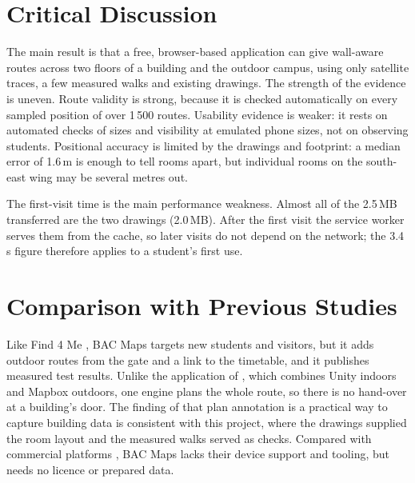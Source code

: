 \documentclass[12pt,a4paper]{report}
\begin{document}
\section{Critical Discussion}
The main result is that a free, browser-based application can give wall-aware routes across two floors of a building and the outdoor campus, using only satellite traces, a few measured walks and existing drawings. The strength of the evidence is uneven. Route validity is strong, because it is checked automatically on every sampled position of over 1\,500 routes. Usability evidence is weaker: it rests on automated checks of sizes and visibility at emulated phone sizes, not on observing students. Positional accuracy is limited by the drawings and footprint: a median error of 1.6\,m is enough to tell rooms apart, but individual rooms on the south-east wing may be several metres out.

The first-visit time is the main performance weakness. Almost all of the 2.5\,MB transferred are the two drawings (2.0\,MB). After the first visit the service worker serves them from the cache, so later visits do not depend on the network; the 3.4\,s figure therefore applies to a student's first use.

\section{Comparison with Previous Studies}
Like Find 4 Me \citep{helmi2022}, BAC Maps targets new students and visitors, but it adds outdoor routes from the gate and a link to the timetable, and it publishes measured test results. Unlike the application of \citet{patel2025}, which combines Unity indoors and Mapbox outdoors, one engine plans the whole route, so there is no hand-over at a building's door. The finding of \citet{ausmeier2012} that plan annotation is a practical way to capture building data is consistent with this project, where the drawings supplied the room layout and the measured walks served as checks. Compared with commercial platforms \citep{mappedin2026, mapbox2026}, BAC Maps lacks their device support and tooling, but needs no licence or prepared data.
\end{document}

